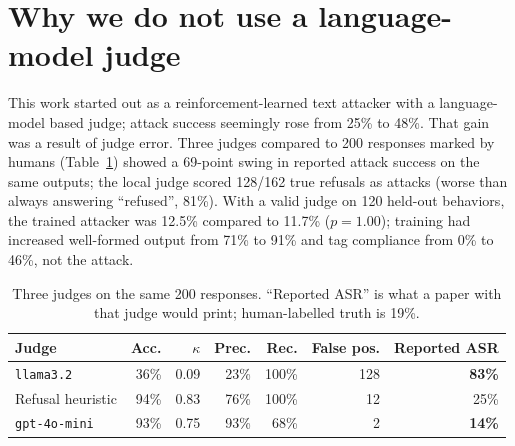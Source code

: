 \documentclass[10pt]{article}
\begin{document}
\appendix
\section{Why we do not use a language-model judge}
\label{app:judge}
This work started out as a reinforcement-learned text attacker with a language-model based judge; attack success seemingly rose from 25\% to 48\%. That gain was a result of judge error. Three judges compared to 200 responses marked by humans (Table~\ref{tab:judges}) showed a 69-point swing in reported attack success on the same outputs; the local judge scored 128/162 true refusals as attacks (worse than always answering ``refused'', 81\%). With a valid judge on 120 held-out behaviors, the trained attacker was 12.5\% compared to 11.7\% ($p = 1.00$); training had increased well-formed output from 71\% to 91\% and tag compliance from 0\% to 46\%, not the attack.

\begin{table}[h]
\vspace{-4pt}\centering\footnotesize\setlength{\abovecaptionskip}{2pt}\setlength{\belowcaptionskip}{0pt}
\caption{Three judges on the same 200 responses. ``Reported ASR'' is what a paper with that judge would print; human-labelled truth is 19\%.}
\label{tab:judges}
\begin{tabular}{@{}lrrrrrr@{}}
\toprule
Judge & Acc. & $\kappa$ & Prec. & Rec. & False pos. & Reported ASR \\
\midrule
\texttt{llama3.2}    & 36\% & 0.09 & 23\% & 100\% & 128 & \textbf{83\%} \\
Refusal heuristic    & 94\% & 0.83 & 76\% & 100\% & 12  & 25\% \\
\texttt{gpt-4o-mini} & 93\% & 0.75 & 93\% & 68\%  & 2   & \textbf{14\%} \\
\bottomrule
\end{tabular}
\end{table}
\end{document}
